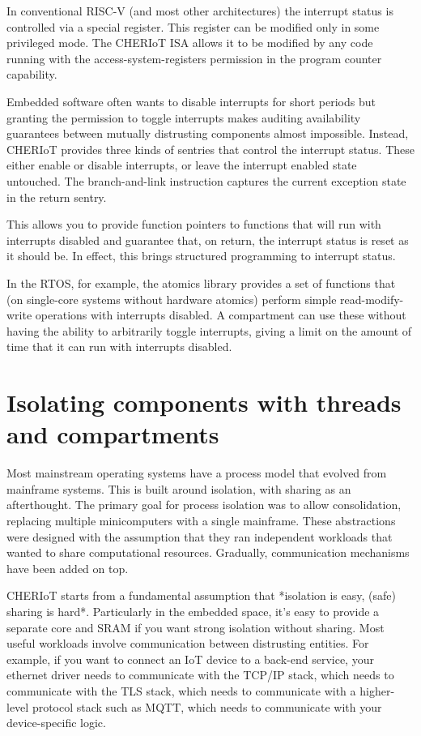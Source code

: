 In conventional RISC-V (and most other architectures) the interrupt status is controlled via a special register.
This register can be modified only in some privileged mode.
The CHERIoT ISA allows it to be modified by any code running with the access-system-registers permission in the program counter capability.

Embedded software often wants to disable interrupts for short periods but granting the permission to toggle interrupts makes auditing availability guarantees between mutually distrusting components almost impossible.
Instead, CHERIoT provides three kinds of sentries that control the interrupt status.
These either enable or disable interrupts, or leave the interrupt enabled state untouched.
The branch-and-link instruction captures the current exception state in the return sentry.

This allows you to provide function pointers to functions that will run with interrupts disabled and guarantee that, on return, the interrupt status is reset as it should be.
In effect, this brings structured programming to interrupt status.

In the RTOS, for example, the atomics library provides a set of functions that (on single-core systems without hardware atomics) perform simple read-modify-write operations with interrupts disabled.
A compartment can use these without having the ability to arbitrarily toggle interrupts, giving a limit on the amount of time that it can run with interrupts disabled.

\section{Isolating components with threads and compartments}

Most mainstream operating systems have a process model that evolved from mainframe systems.
This is built around isolation, with sharing as an afterthought.
The primary goal for process isolation was to allow consolidation, replacing multiple minicomputers with a single mainframe.
These abstractions were designed with the assumption that they ran independent workloads that wanted to share computational resources.
Gradually, communication mechanisms have been added on top.

CHERIoT starts from a fundamental assumption that *isolation is easy, (safe) sharing is hard*.
Particularly in the embedded space, it's easy to provide a separate core and SRAM if you want strong isolation without sharing.
Most useful workloads involve communication between distrusting entities.
For example, if you want to connect an IoT device to a back-end service, your ethernet driver needs to communicate with the TCP/IP stack, which needs to communicate with the TLS stack, which needs to communicate with a higher-level protocol stack such as MQTT, which needs to communicate with your device-specific logic.

